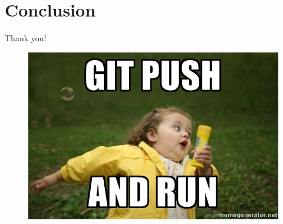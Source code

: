 \documentclass{beamer}
\begin{document}
\section
  {Conclusion}

\begin{frame}{Thank you!}
  \begin{figure}[t]
    \centering
    \includegraphics[height=\dimexpr10\textheight/16\relax]{gitmeme}
  \end{figure}
\end{frame}
\end{document}
